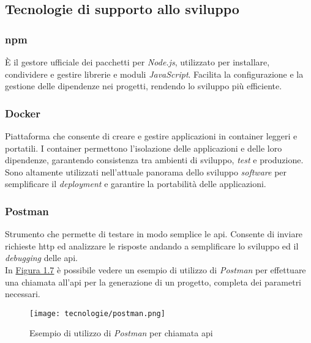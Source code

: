\pagebreak
\subsection{Tecnologie di supporto allo sviluppo}
\label{sez:tecnologie-supporto-sviluppo}

\subsubsection{\gls{npm}}

È il gestore ufficiale dei pacchetti per \textit{Node.js}, utilizzato per installare, condividere e gestire librerie e moduli \textit{JavaScript}. 
Facilita la configurazione e la gestione delle dipendenze nei progetti, rendendo lo sviluppo più efficiente.

\subsubsection{Docker}

Piattaforma che consente di creare e gestire applicazioni in \gls{container} leggeri e portatili.
I \gls{container} permettono l’isolazione delle applicazioni e delle loro dipendenze, garantendo consistenza tra ambienti di sviluppo, \textit{test} e produzione.\\
Sono altamente utilizzati nell'attuale panorama dello sviluppo \textit{software} per semplificare il \textit{deployment} e garantire la portabilità delle applicazioni.

\subsubsection{Postman}

Strumento che permette di testare in modo semplice le \gls{api}. 
Consente di inviare richieste \gls{http} ed analizzare le risposte andando a semplificare lo sviluppo ed il \textit{debugging} delle \gls{api}. \\
In {\hyperref[fig:postman]{Figura 1.7}} è possibile vedere un esempio di utilizzo di \textit{Postman} per effettuare una chiamata all'\gls{api} per
la generazione di un progetto, completa dei parametri necessari.

\begin{figure}[H]
    \label{fig:postman}
    \centering
    \texttt{[image: tecnologie/postman.png]}
    \caption{Esempio di utilizzo di \textit{Postman} per chiamata \gls{api}}
\end{figure}

